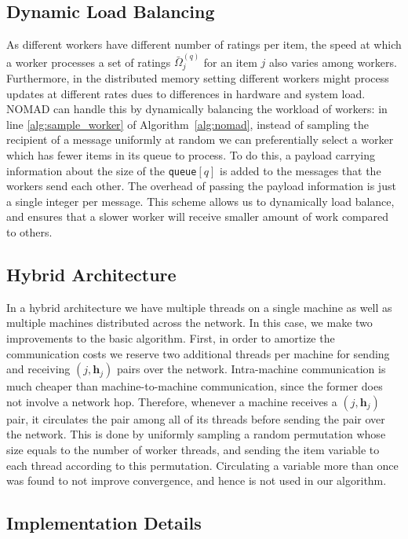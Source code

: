 \documentclass{vldb}
\newcommand{\hb}{\mathbf{h}}
\newcommand{\Omegabar}{\bar{\Omega}}
\begin{document}
\subsection{Dynamic Load Balancing}
\label{sec:dynamic_load_balancing}

As different workers have different number of ratings per item, the
speed at which a worker processes a set of ratings $\Omegabar_j^{(q)}$
for an item $j$ also varies among workers.  Furthermore, in the
distributed memory setting different workers might process updates at
different rates dues to differences in hardware and system load.
NOMAD can handle this by dynamically balancing the workload of
workers: in line \ref{alg:sample_worker} of Algorithm~\ref{alg:nomad},
instead of sampling the recipient of a message uniformly at random we
can preferentially select a worker which has fewer items in its queue
to process. To do this, a payload carrying information about the size
of the \texttt{queue}$[q]$ is added to the messages that the workers
send each other. The overhead of passing the payload information is
just a single integer per message. This scheme allows us to
dynamically load balance, and ensures that a slower worker will
receive smaller amount of work compared to others.

\subsection{Hybrid Architecture}
\label{sec:multi_multi}

In a hybrid architecture we have multiple threads on a single machine as
well as multiple machines distributed across the network. In this case,
we make two improvements to the basic algorithm. First, in order to
amortize the communication costs we reserve two additional threads per
machine for sending and receiving $(j, \hb_{j})$ pairs over the
network. Intra-machine communication is much cheaper than
machine-to-machine communication, since the former does not involve a
network hop.  Therefore, whenever a machine receives a $(j, \hb_{j})$
pair, it circulates the pair among all of its threads before sending the
pair over the network. This is done by uniformly sampling a random
permutation whose size equals to the number of worker threads, and
sending the item variable to each thread according to this
permutation. Circulating a variable more than once was found to not
improve convergence, and hence is not used in our algorithm.



\subsection{Implementation Details}
\label{sec:ImplDeta}
\end{document}
